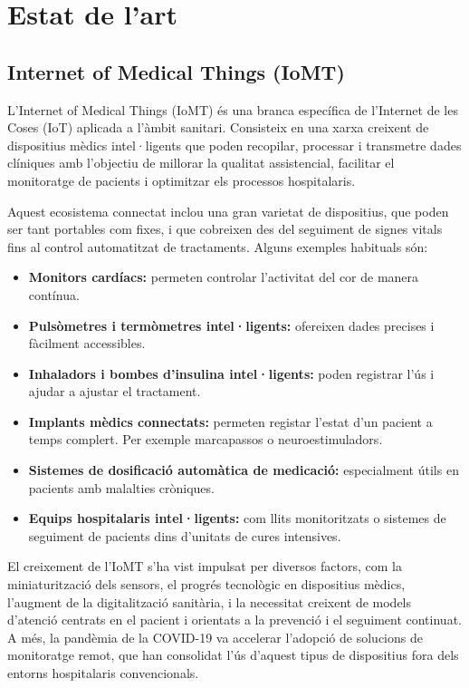
\ifcase\doclanguage
\or
  \chapter[Estat de l'art]{Estat de l'art}
  
  \section{Internet of Medical Things (IoMT)} 
  L’Internet of Medical Things (IoMT) és una branca específica de l’Internet de les Coses (IoT) aplicada a l’àmbit sanitari. Consisteix en una xarxa creixent de dispositius mèdics intel·ligents que poden recopilar, processar i transmetre dades clíniques amb l’objectiu de millorar la qualitat assistencial, facilitar el monitoratge de pacients i optimitzar els processos hospitalaris.

  Aquest ecosistema connectat inclou una gran varietat de dispositius, que poden ser tant portables com fixes, i que cobreixen des del seguiment de signes vitals fins al control automatitzat de tractaments. Alguns exemples habituals són:

  \begin{itemize}
    \item \textbf{Monitors cardíacs:} permeten controlar l’activitat del cor de manera contínua.
    \item \textbf{Pulsòmetres i termòmetres intel·ligents:} ofereixen dades precises i fàcilment accessibles.
    \item \textbf{Inhaladors i bombes d’insulina intel·ligents:} poden registrar l’ús i ajudar a ajustar el tractament.
    \item \textbf{Implants mèdics connectats: } permeten registar l'estat d'un pacient a temps complert. Per exemple marcapassos o neuroestimuladors.
    \item \textbf{Sistemes de dosificació automàtica de medicació:} especialment útils en pacients amb malalties cròniques.
    \item \textbf{Equips hospitalaris intel·ligents:} com llits monitoritzats o sistemes de seguiment de pacients dins d’unitats de cures intensives.
  \end{itemize}

  El creixement de l’IoMT s’ha vist impulsat per diversos factors, com la miniaturització dels sensors, el progrés tecnològic en dispositius mèdics, l’augment de la digitalització sanitària, i la necessitat creixent de models d’atenció centrats en el pacient i orientats a la prevenció i el seguiment continuat. A més, la pandèmia de la COVID-19 va accelerar l’adopció de solucions de monitoratge remot, que han consolidat l’ús d’aquest tipus de dispositius fora dels entorns hospitalaris convencionals.

